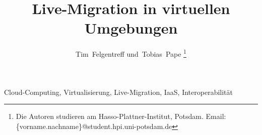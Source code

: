 \title{Live-Migration in virtuellen Umgebungen
}
\author{Tim~Felgentreff und~Tobias~Pape%
\thanks{%
  Die Autoren studieren am
  Hasso-Plattner-Institut, Potsdam.\goodbreak
  Email: \{vorname.nachname\}@student.hpi.uni-potsdam.de}%
}

\maketitle

\ifdraft{\tableofcontents}{}

\begin{abstract}
  
\end{abstract}

\begin{IEEEkeywords}
  Cloud-Computing, Virtualisierung, Live-Migration, IaaS, Interoperabilität
\end{IEEEkeywords}
\IEEEpeerreviewmaketitle

